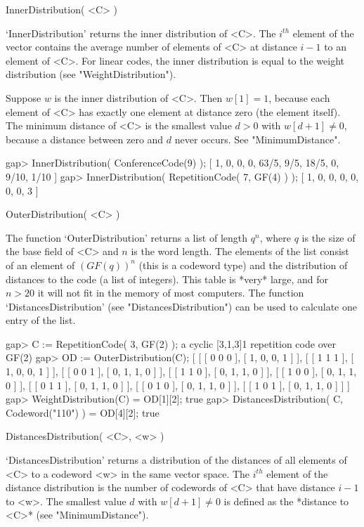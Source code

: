 \>InnerDistribution( <C> )

`InnerDistribution'  returns the inner distribution  of <C>. The $i^{th}$
element of the vector contains the  average number of  elements of <C> at
distance   $i-1$ to  an element   of <C>.  For  linear  codes, the  inner
distribution    is   equal    to     the  weight    distribution     (see
"WeightDistribution").

Suppose  $w$ is the inner distribution  of <C>. Then  $w[1] = 1$, because
each element of <C> has exactly one element at distance zero (the element
itself). The minimum distance of  <C> is the smallest  value $d > 0$ with
$w[d+1]  \neq  0$, because  a    distance between  zero  and  $d$   never
occurs. See "MinimumDistance".

\beginexample
gap> InnerDistribution( ConferenceCode(9) );
[ 1, 0, 0, 0, 63/5, 9/5, 18/5, 0, 9/10, 1/10 ]
gap> InnerDistribution( RepetitionCode( 7, GF(4) ) );
[ 1, 0, 0, 0, 0, 0, 0, 3 ] 
\endexample

\>OuterDistribution( <C> )

The function  `OuterDistribution' returns a  list of  length $q^n$, where
$q$ is the size of the base field of <C> and $n$  is the word length. The
elements of  the list  consist of  an element of  $(GF(q))^n$ (this  is a
codeword type)  and the distribution of distances  to the code (a list of
integers).  This table is *very* large, and for $n >  20$ it will not fit
in the memory   of most computers.  The function  `DistancesDistribution'
(see "DistancesDistribution") can be used  to calculate one entry of  the
list.

\beginexample
gap> C := RepetitionCode( 3, GF(2) );
a cyclic [3,1,3]1 repetition code over GF(2)
gap> OD := OuterDistribution(C);
[ [ [ 0 0 0 ], [ 1, 0, 0, 1 ] ], [ [ 1 1 1 ], [ 1, 0, 0, 1 ] ],
  [ [ 0 0 1 ], [ 0, 1, 1, 0 ] ], [ [ 1 1 0 ], [ 0, 1, 1, 0 ] ],
  [ [ 1 0 0 ], [ 0, 1, 1, 0 ] ], [ [ 0 1 1 ], [ 0, 1, 1, 0 ] ],
  [ [ 0 1 0 ], [ 0, 1, 1, 0 ] ], [ [ 1 0 1 ], [ 0, 1, 1, 0 ] ] ]
gap> WeightDistribution(C) = OD[1][2];
true
gap> DistancesDistribution( C, Codeword("110") ) = OD[4][2];
true 
\endexample

\>DistancesDistribution( <C>, <w> )

`DistancesDistribution' returns a  distribution  of the distances of  all
elements of <C> to a codeword <w> in the same  vector space. The $i^{th}$
element of the  distance distribution is the  number of codewords of  <C>
that have distance $i-1$ to <w>. The smallest value $d$ with $w[d+1] \neq
0$ is defined as the *distance to <C>* (see "MinimumDistance").

